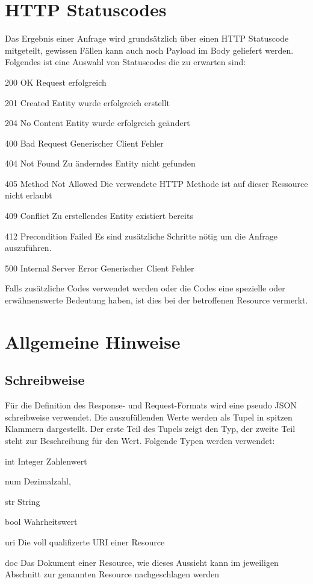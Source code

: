 \documentclass[10pt,a4paper]{scrartcl}
\begin{document}
\pagebreak
\section{HTTP Statuscodes}
Das Ergebnis einer Anfrage wird grundsätzlich über einen HTTP Statuscode mitgeteilt, gewissen Fällen
kann auch noch Payload im Body geliefert werden. Folgendes ist eine Auswahl von Statuscodes die zu
erwarten sind:

\begin{description*}
    \item[200 OK] Request erfolgreich
	\item[201 Created] Entity wurde erfolgreich erstellt
	\item[204 No Content] Entity wurde erfolgreich geändert
	\item[400 Bad Request] Generischer Client Fehler
	\item[404 Not Found] Zu änderndes Entity nicht gefunden
	\item[405 Method Not Allowed] Die verwendete HTTP Methode ist auf dieser Ressource nicht erlaubt
	\item[409 Conflict] Zu erstellendes Entity existiert bereits
	\item[412 Precondition Failed] Es sind zusätzliche Schritte nötig um die Anfrage auszuführen.
	\item[500 Internal Server Error] Generischer Client Fehler
\end{description*}

Falls zusätzliche Codes verwendet werden oder die Codes eine spezielle oder erwähnenswerte Bedeutung haben, ist dies bei der betroffenen Resource vermerkt.


\pagebreak
\section{Allgemeine Hinweise}

\subsection{Schreibweise}
Für die Definition des Response- und Request-Formats wird eine pseudo JSON schreibweise verwendet. Die
auszufüllenden Werte werden als Tupel in spitzen Klammern dargestellt. Der erste Teil des Tupels zeigt 
den Typ, der zweite Teil steht zur Beschreibung für den Wert. Folgende Typen werden verwendet:
\begin{description*}
    \item[int] Integer Zahlenwert
    \item[num] Dezimalzahl, 
    \item[str] String
    \item[bool] Wahrheitswert
    \item[uri] Die voll qualifizerte URI einer Resource
    \item[doc] Das Dokument einer Resource, wie dieses Aussieht kann im jeweiligen Abschnitt zur genannten Resource nachgeschlagen werden
\end{description*}
\end{document}
